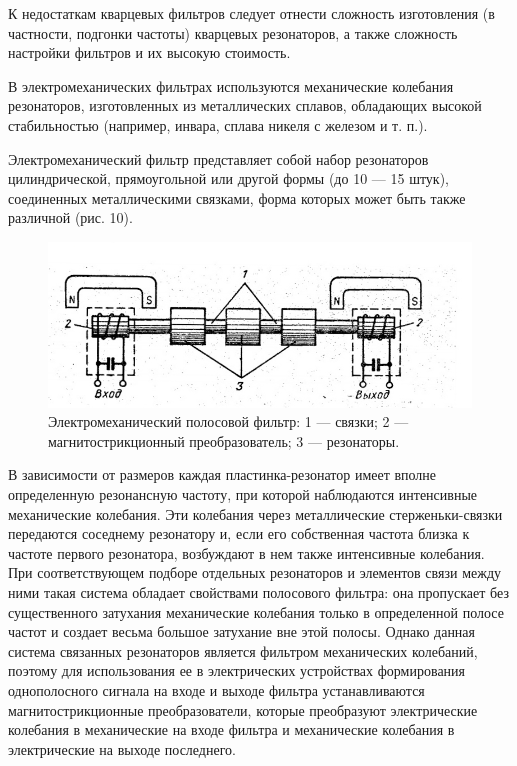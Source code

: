 К недостаткам кварцевых фильтров следует отнести сложность изготовления (в частности, подгонки частоты) кварцевых резонаторов, а также сложность настройки фильтров и их высокую стоимость.

В электромеханических фильтрах используются механические колебания резонаторов, изготовленных из металлических сплавов, обладающих высокой стабильностью (например, инвара, сплава никеля с железом и т. п.). 

Электромеханический фильтр представляет собой набор резонаторов цилиндрической, прямоугольной или другой формы (до 10 — 15 штук), соединенных металлическими связками, форма которых может быть также различной (рис. 10).  

\begin{figure}[h!]
	\centering
	\includegraphics[width=0.8\linewidth]{fig/fig10}
	\caption{Электромеханический полосовой фильтр:
1 — связки; 2 — магнитострикционный преобразователь; 3 — резонаторы.}
	\label{fig:fig10}
\end{figure}

В зависимости от размеров каждая пластинка-резонатор имеет вполне определенную резонансную частоту, при которой наблюдаются интенсивные механические колебания. Эти колебания через металлические стерженьки-связки передаются соседнему резонатору и, если его собственная частота близка к частоте первого резонатора, возбуждают в нем также интенсивные колебания. При соответствующем подборе отдельных резонаторов и элементов связи между ними такая система обладает свойствами полосового фильтра: она пропускает без существенного затухания механические колебания только в
определенной полосе частот и создает весьма большое затухание вне этой полосы. Однако данная система связанных резонаторов является фильтром механических колебаний, поэтому для использования ее в электрических устройствах формирования однополосного сигнала на входе и выходе фильтра устанавливаются магнитострикционные преобразователи, которые преобразуют электрические колебания в механические на входе фильтра и механические колебания в электрические на выходе последнего.

